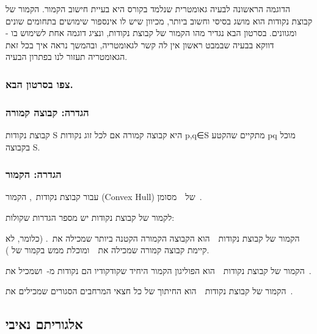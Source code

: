 \documentclass[
]{book}
\theoremstyle{definition}
\theoremstyle{definition}
\theoremstyle{definition}
\theoremstyle{definition}
\theoremstyle{remark}
\begin{document}
הדוגמה הראשונה לבעיה גאומטרית שנלמד בקורס היא בעיית חישוב הקמור. הקמור של קבוצת נקודות הוא מושג בסיסי וחשוב ביותר, מכיוון שיש לו אינספור שימושים בתחומים שונים ומגוונים. בסרטון הבא נגדיר מהו הקמור של קבוצת נקודות, ונציג דוגמה אחת לשימוש בו - דווקא בבעיה שבמבט ראשון אין לה קשר לגאומטריה, ובהמשך נראה איך בכל זאת הגאומטריה תעזור לנו בפתרון הבעיה.

\hypertarget{ux5e6ux5e4ux5d5-ux5d1ux5e1ux5e8ux5d8ux5d5ux5df-ux5d4ux5d1ux5d0.-1}{%
\subsubsection{צפו בסרטון הבא.}\label{ux5e6ux5e4ux5d5-ux5d1ux5e1ux5e8ux5d8ux5d5ux5df-ux5d4ux5d1ux5d0.-1}}

\hypertarget{ux5d4ux5d2ux5d3ux5e8ux5d4-ux5e7ux5d1ux5d5ux5e6ux5d4-ux5e7ux5deux5d5ux5e8ux5d4}{%
\subsubsection{הגדרה: קבוצה קמורה}\label{ux5d4ux5d2ux5d3ux5e8ux5d4-ux5e7ux5d1ux5d5ux5e6ux5d4-ux5e7ux5deux5d5ux5e8ux5d4}}

קבוצת נקודות S היא קבוצה קמורה אם לכל זוג נקודות p,q∈S מתקיים שהקטע pq מוכל בקבוצה S.

\hypertarget{ux5d4ux5d2ux5d3ux5e8ux5d4-ux5d4ux5e7ux5deux5d5ux5e8}{%
\subsubsection{הגדרה: הקמור}\label{ux5d4ux5d2ux5d3ux5e8ux5d4-ux5d4ux5e7ux5deux5d5ux5e8}}

עבור קבוצת נקודות~, הקמור (Convex Hull) של~~מסומן~.

לקמור של קבוצת נקודות יש מספר הגדרות שקולות:

הקמור של קבוצת נקודות~~הוא הקבוצה הקמורה הקטנה ביותר שמכילה את~. (כלומר, לא קיימת קבוצה קמורה שמכילה את~~ומוכלת ממש בקמור של ).

הקמור של קבוצת נקודות~~הוא הפוליגון הקמור היחיד שקודקודיו הם נקודות מ-~ושמכיל את~.

הקמור של קבוצת נקודות~~הוא החיתוך של כל חצאי המרחבים הסגורים שמכילים את~.

\hypertarget{ux5d0ux5dcux5d2ux5d5ux5e8ux5d9ux5eaux5dd-ux5e0ux5d0ux5d9ux5d1ux5d9}{%
\subsection{\texorpdfstring{\textbf{אלגוריתם נאיבי}}{אלגוריתם נאיבי}}\label{ux5d0ux5dcux5d2ux5d5ux5e8ux5d9ux5eaux5dd-ux5e0ux5d0ux5d9ux5d1ux5d9}}
\end{document}
